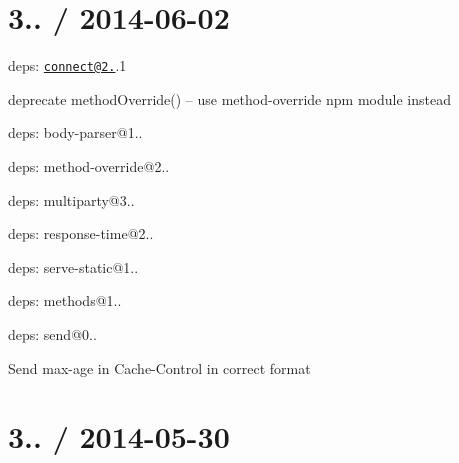 {\ttfamily \section*{3.. / 2014-\/06-\/02 }}

{\ttfamily }

{\ttfamily 
\begin{DoxyItemize}
\item deps\+: \href{mailto:connect@2.19}{\tt connect@2.}.1
\begin{DoxyItemize}
\item deprecate {\ttfamily method\+Override()} -- use {\ttfamily method-\/override} npm module instead
\item deps\+: body-\/parser@1..
\item deps\+: method-\/override@2..
\item deps\+: multiparty@3..
\item deps\+: response-\/time@2..
\item deps\+: serve-\/static@1..
\end{DoxyItemize}
\item deps\+: methods@1..
\item deps\+: send@0..
\begin{DoxyItemize}
\item Send {\ttfamily max-\/age} in {\ttfamily Cache-\/\+Control} in correct format
\end{DoxyItemize}
\end{DoxyItemize}}

{\ttfamily \section*{3.. / 2014-\/05-\/30 }}

{\ttfamily }

